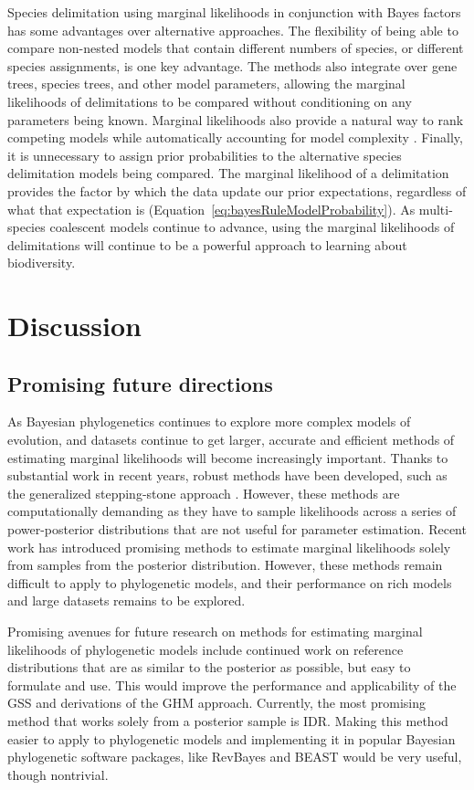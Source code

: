 Species delimitation using marginal likelihoods in conjunction with Bayes
factors has some advantages over alternative approaches.
The flexibility of being able to compare non-nested models that contain
different numbers of species, or different species assignments, is one key
advantage.
The methods also integrate over gene trees, species trees, and other model
parameters, allowing the marginal likelihoods of delimitations to be compared
without conditioning on any parameters being known.
Marginal likelihoods also provide a natural way to rank competing models while
automatically accounting for model complexity \citep{Baele2012}.
Finally, it is unnecessary to assign prior probabilities to the alternative
species delimitation models being compared.
The marginal likelihood of a delimitation provides the factor by which the data
update our prior expectations, regardless of what that expectation is
(Equation~\ref{eq:bayesRuleModelProbability}).
As multi-species coalescent models continue to advance, using the marginal
likelihoods of delimitations will continue to be a powerful approach to
learning about biodiversity.


\section{Discussion}

\subsection{Promising future directions}

As Bayesian phylogenetics continues to explore more complex models of
evolution, and datasets continue to get larger, accurate and efficient methods
of estimating marginal likelihoods will become increasingly important.
Thanks to substantial work in recent years, robust methods have been developed,
such as the generalized stepping-stone approach \citep{Fan2011}.
However, these methods are computationally demanding as they have to sample
likelihoods across a series of power-posterior distributions that are not
useful for parameter estimation.
Recent work has introduced promising methods to estimate marginal likelihoods
solely from samples from the posterior distribution.
However, these methods remain difficult to apply to phylogenetic models, and
their performance on rich models and large datasets remains to be explored.

Promising avenues for future research on methods for estimating marginal
likelihoods of phylogenetic models include continued work on reference
distributions that are as similar to the posterior as possible, but easy to
formulate and use.
This would improve the performance and applicability of the GSS and derivations
of the GHM approach.
Currently, the most promising method that works solely from a posterior
sample is IDR.
Making this method easier to apply to phylogenetic models and implementing
it in popular Bayesian phylogenetic software packages,
like
RevBayes \citep{Hohna2016}
and
BEAST \citep{Drummond2012,Bouckaert2014}
would be very useful, though nontrivial.

